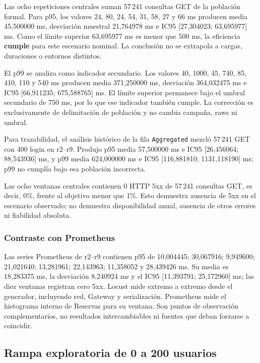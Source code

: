 Las ocho repeticiones centrales suman 57\,241 consultas GET de la población
formal. Para p95, los valores 24, 80, 24, 54, 31, 58, 27 y 66 ms producen media
45,500000 ms, desviación muestral 21,764978 ms e IC95
[27,304023; 63,695977] ms. Como el límite superior 63,695977 ms es menor que
500 ms, la eficiencia \textbf{cumple} para este
escenario nominal. La conclusión no se extrapola a cargas, duraciones o entornos
distintos.

El p99 se analiza como indicador secundario. Los valores 40, 1000, 45, 740, 85,
410, 110 y 540 ms producen media 371,250000 ms, desviación 364,032475 ms e IC95
[66,911235; 675,588765] ms. El límite superior permanece bajo el umbral
secundario de 750 ms, por lo que ese indicador también cumple. La corrección es
exclusivamente de delimitación de población y no cambia campaña, raws ni umbral.

Para trazabilidad, el análisis histórico de la fila \texttt{Aggregated} mezcló
57\,241 GET con 400 login en r2--r9. Produjo p95 media 57,500000 ms e IC95
[26,456064; 88,543936] ms, y p99 media 624,000000 ms e IC95
[116,881810; 1131,118190] ms; p99 no cumplía bajo esa población incorrecta.

Las ocho ventanas centrales contienen 0 HTTP 5xx de 57\,241 consultas GET, es
decir, 0\%, frente al objetivo menor que 1\%. Esto demuestra ausencia de 5xx en
el escenario observado; no demuestra disponibilidad anual, ausencia de otros
errores ni fiabilidad absoluta.

\subsubsection{Contraste con Prometheus}

Las series Prometheus de r2--r9 contienen p95 de 10,004445; 30,067916;
9,949600; 21,021640; 13,281961; 22,143963; 11,358052 y 28,439426 ms. Su media es
18,283375 ms, la desviación 8,240924 ms y el IC95 [11,393791; 25,172960] ms;
las diez ventanas registran cero 5xx. Locust mide extremo a extremo desde el
generador, incluyendo red, Gateway y serialización. Prometheus mide el histograma
interno de Reservas para su ventana. Son puntos de observación complementarios,
no resultados intercambiables ni fuentes que deban forzarse a coincidir.

\subsection{Rampa exploratoria de 0 a 200 usuarios}
\label{subsec:rampa-exploratoria}

